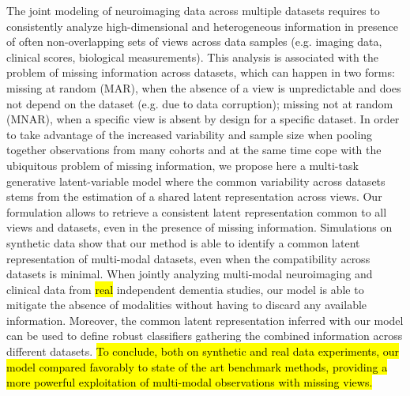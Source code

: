 The joint modeling of neuroimaging data across multiple datasets requires to consistently analyze high-dimensional and heterogeneous information in presence of often non-overlapping sets of views across data samples (e.g. imaging data, clinical scores, biological measurements).
This analysis is associated with the problem of missing information across datasets, which can happen in two forms:
missing at random (MAR), when the absence of a view is unpredictable and does not depend on the dataset (e.g. due to data corruption);
missing not at random (MNAR), when a specific view is absent by design for a specific dataset.
%
In order to take advantage of the increased variability and sample size when pooling together observations from many cohorts
and at the same time cope with the ubiquitous problem of missing information,
we propose here a multi-task generative latent-variable model where the common variability across datasets stems from the estimation of a shared latent representation across views.
Our formulation allows to retrieve a consistent latent representation common to all views and datasets, even in the presence of missing information.
%
Simulations on synthetic data show that our method is able to identify a common latent representation of multi-modal datasets, even when the compatibility across datasets is minimal.
%
When jointly analyzing multi-modal neuroimaging and clinical data from \hl{real} independent dementia studies, our model is able to mitigate the absence of modalities without having to discard any available information.
Moreover, the common latent representation inferred with our model can be used to define robust classifiers gathering the combined information across different datasets.
%
\hl{To conclude, both on synthetic and real data experiments, our model compared favorably to state of the art benchmark methods, providing a more powerful exploitation of multi-modal observations with missing views.}
